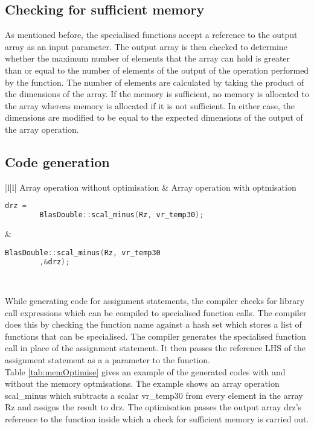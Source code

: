 \subsection{Checking for sufficient memory}

As mentioned before, the specialised functions accept a reference to the output array as an input parameter. The output array is then checked to determine whether the maximum number of elements that the array can hold is greater than or equal to the number of elements of the output of the operation performed by the function. The number of elements are calculated by taking the product of the dimensions of the array. If the memory is sufficient, no memory is allocated to the array whereas memory is allocated if it is not sufficient. In either case, the dimensions are modified to be equal to the expected dimensions of the output of the array operation.   
\subsection{Code generation}
\begin{table}[htbp]
	\centering
  \begin{tabular}{|l|l|}
  \hline
  Array operation without optimisation & 
Array operation with optmisation 
   \\
  \hline
  
  {
  \begin{lstlisting}[language=c,frame=none, numbers=none]
	drz = 
		BlasDouble::scal_minus(Rz, vr_temp30);
  \end{lstlisting}
  } &
   {
   \begin{lstlisting}[language=c,frame=none, numbers=none]
	 BlasDouble::scal_minus(Rz, vr_temp30
		,&drz);
   \end{lstlisting}
   } \\
   \hline
   \end{tabular}
   \caption[Generated code with and without memory optimisations]{Table shows the generated code with and without memory optimisations}
   \label{tab:memOptimise}
   \end{table}

While generating code for assignment statements, the compiler checks for library call expressions which can be compiled to specialised function calls. The compiler does this by checking the function name against a hash set which stores a list of functions that can be specialised. The compiler generates the specialised function call in place of the assignment statement. It then passes the reference LHS of the assignment statement as a a parameter to the function. \\
Table \ref{tab:memOptimise} gives an example of the generated codes with and without the memory optmisations. The example shows an array operation scal\_minus which subtracts a scalar vr\_temp30 from every element in the array Rz and assigns the result to drz.  The optimisation passes the output array drz's reference to the function inside which a check for sufficient memory is carried out.
